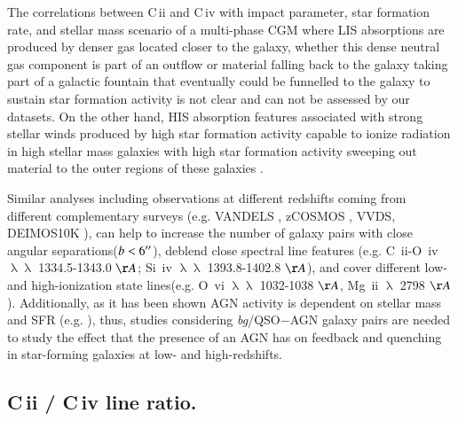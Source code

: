 \documentclass[longauth]{aa}
\begin{document}
The correlations between  C\,{\sc ii} and C\,{\sc iv} with impact parameter,
star formation rate, and stellar mass scenario of a multi-phase CGM where LIS
absorptions are produced by denser gas located closer to the galaxy, whether
this dense neutral gas component is part of an outflow or material falling
back to the galaxy taking part of a galactic fountain that eventually could
be funnelled to the galaxy to sustain star formation activity \citep
{Keres05} is not clear and can not be assessed by our datasets. On the other
hand, HIS absorption features associated with strong stellar winds produced
by high star formation activity capable to ionize radiation in high stellar
mass galaxies with high star formation activity sweeping out material to the
outer regions of these galaxies \citep
{Putman17,Bower16,Oppenheimer16,Voit15b}. 

Similar analyses including observations at different redshifts coming from
different complementary surveys  (e.g. VANDELS \citep
{McLure18,Pentericci18}, zCOSMOS \citep{Lilly07,Lilly09}, VVDS\citep
{LeFevre13b}, DEIMOS10K \citep{Hasinger18}), can help to increase the number
of galaxy pairs with close angular separations($b<6^{\prime\prime}$), deblend close
spectral line features (e.g. C \,{\sc ii}-O \,{\sc iv} $\uplambda\uplambda$
1334.5-1343.0 $\AA$; Si \,{\sc iv} $\uplambda\uplambda$ 1393.8-1402.8 $\AA$),
and cover different low- and high-ionization state lines(e.g.  O \,{\sc vi}
$\uplambda\uplambda$ 1032-1038 $\AA$,  Mg \,{\sc ii} $\uplambda$ 2798 $\AA$).
Additionally, as it has been shown AGN activity is dependent on stellar mass
and SFR (e.g. \citealt{Lemaux14,Bongiorno16,Magliocchetti20}), thus, studies
considering \textit{bg}/QSO$-$AGN galaxy pairs \citep
{Hennawi06,Prochaska14} are needed to study the effect that the presence of
an AGN has on feedback and quenching in star-forming galaxies at low- and
high-redshifts.

\subsection{C\,{\sc ii} / C\,{\sc iv} line ratio.} 
\end{document}

